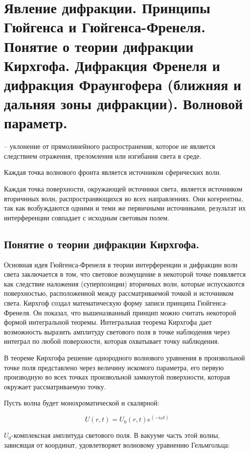 \section{Явление дифракции. Принципы Гюйгенса и Гюйгенса-Френеля. Понятие о теории дифракции Кирхгофа. Дифракция Френеля и дифракция Фраунгофера (ближняя и дальняя зоны дифракции). Волновой параметр.}

 -- уклонение от прямолинейного распространения, которое не является следствием отражения, преломления или изгибания света в среде. 

Каждая точка волнового фронта является источником сферических волн.

Каждая точка поверхности, окружающей источники света, является источником вторичнных волн, распространяющихся во всех направлениях. Они когерентны, так как возбуждаются одними и теми же первичными источниками, результат их интерференции совпадает с исходным световым полем. 

\subsection{ Понятие о теории дифракции Кирхгофа.}
Основная идея Гюйгенса-Френеля в теории интерференции и дифракции волн света заключается в том, что световое возмущение в некоторой точке появляется как следствие наложения (суперпозиции) вторичных волн, которые испускаются поверхностью, расположенной между рассматриваемой точкой и источником света. Кирхгоф создал математическую форму записи принципа Гюйгенса-Френеля. Он показал, что вышеназванный принцип можно считать некоторой формой интегральной теоремы.
Интегральная теорема Кирхгофа дает возможность выразить амплитуду светового поля в точке наблюдения через интеграл по любой поверхности, которая охватывает точку наблюдения.

В теореме Кирхгофа решение однородного волнового уравнения в произвольной точке поля представлено через величину искомого параметра, его первую производную во всех точках произвольной замкнутой поверхности, которая окружает рассматриваемую точку.

Пусть волна будет монохроматической и скалярной:

\begin{equation*}
	U(r, t)=U_0(r, t)e^{(-i\omega t)}
\end{equation*}

$U_0$-комплексная амплитуда светового поля. В вакууме часть этой волны, зависящая от координат, удовлетворяет волновому уравнению Гельмгольца:

